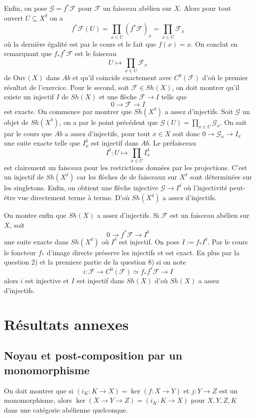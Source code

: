 \documentclass[a4paper,12pt]{article}
\newcommand{\F}{\mathscr F}
\newcommand{\Ouv}{\textrm{Ouv}}
\newcommand{\G}{\mathscr{G}}
\theoremstyle{plain}
\theoremstyle{definition}
\theoremstyle{remark}
\begin{document}
Enfin, on pose
$\G=f^*\F$ pour $\F$ un faisceau abélien sur $X$. Alors pour tout
ouvert $U\subseteq X^\delta$ on a 
\[f^*\F(U)=\prod_{x\in U} (f^*\F)_x = \prod_{x\in U} \F_x\]
où la dernière égalité est par le cours et le fait que $f(x)=x$. On 
conclut en remarquant que $f_*f^*\F$ est le faisceau 
\[U\mapsto \prod_{x\in U}\F_x\]
de $\Ouv(X)$ dans $Ab$ et qu'il coincide exactement avec $C^0(\F)$ d'où
le premier résultat de l'exercice.
\newline
Pour le second, soit $\F\in Sh(X)$, on doit montrer qu'il existe
un injectif $I$ de $Sh(X)$ et une flèche $\F\to I$ telle que 
\[0\to \F\to I\]
est exacte. On commence par montrer que $Sh(X^\delta)$ a assez
d'injectifs. Soit $\G$ un objet de $Sh(X^\delta)$, on a par le 
point précédent que $\G(U)=\prod_{x\in U}\G_x$. On sait par le
cours que $Ab$ a assez d'injectifs, pour tout $x\in X$ soit donc
$0\to \G_x\to I_x$ une suite exacte telle que $I^\delta_x$ est injectif
dans $Ab$. Le préfaisceau \[I^\delta\colon U\mapsto \prod_{x\in U}
I^\delta_x\]
est clairement un faisceau pour les restrictions données par les
projections. C'est un injectif de $Sh(X^\delta)$ car les flèches de
de faisceaux sur $X^\delta$ sont déterminées sur les singletons. 
Enfin, on obtient une flèche injective $\G\to I^\delta$
où l'injectivité peut-être vue directement terme à terme. D'où
$Sh(X^\delta)$ a assez d'injectifs.
\newline

On montre enfin que $Sh(X)$ a assez d'injectifs. Si 
$\F$ est un faisceau abélien sur $X$, soit 
\[0\to f^*\F\to I^\delta\]
une suite exacte dans $Sh(X^\delta)$ où $I^\delta$ est injectif. On
pose $I:=f_* I^\delta$. Par le cours le foncteur $f_*$ d'image directe
préserve les injectifs et est exact. En plus par la question 2) et 
la premiere partie de la question 8) si on note 
\[i\colon \F\to C^0(\F)\simeq f_*f^*\F \to I\]
alors $i$ est injective et $I$ est injectif dans $Sh(X)$ d'où
$Sh(X)$ a assez d'injectifs.


\section{Résultats annexes}
\subsection{Noyau et post-composition par un monomorphisme}
On doit montrer que si
$(i_K\colon K\to X)=\ker(f\colon X\to Y)$ et $j\colon Y\to Z$ est un
monomorphisme, alors $\ker(X\to Y\to Z)=(i_K\colon K\to X)$ pour 
$X,Y,Z,K$ dans une catégorie abélienne quelconque.
\end{document}
